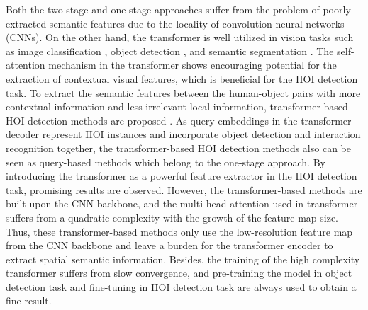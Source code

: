 \documentclass[10pt,twocolumn,letterpaper]{article}
\begin{document}
Both the two-stage and one-stage approaches suffer from the problem of poorly extracted semantic features due to the locality of convolution neural networks (CNNs).
On the other hand, the transformer \cite{waswani2017attention} is well utilized in vision tasks such as image classification \cite{dosovitskiy2021an,liu2021swin}, object detection \cite{liu2021swin,carion2020end,zhu2020deformable}, and semantic segmentation \cite{liu2021swin,wang2020max}.
The self-attention mechanism in the transformer shows encouraging potential for the extraction of contextual visual features, which is beneficial for the HOI detection task.
To extract the semantic features between the human-object pairs with more contextual information and less irrelevant local information, transformer-based HOI detection methods are proposed \cite{kim2021hotr,zou2021end,chen2021reformulating,tamura2021qpic}.
As query embeddings in the transformer decoder represent HOI instances and incorporate object detection and interaction recognition together, the transformer-based HOI detection methods also can be seen as query-based methods which belong to the one-stage approach.
By introducing the transformer as a powerful feature extractor in the HOI detection task, promising results are observed.
However, the transformer-based methods \cite{kim2021hotr,zou2021end,chen2021reformulating,tamura2021qpic} are built upon the CNN backbone, and the multi-head attention used in transformer suffers from a quadratic complexity with the growth of the feature map size.
Thus, these transformer-based methods only use the low-resolution feature map from the CNN backbone and leave a burden for the transformer encoder to extract spatial semantic information.
Besides, the training of the high complexity transformer suffers from slow convergence, and pre-training the model in object detection task and fine-tuning in HOI detection task are always used to obtain a fine result.
\end{document}
